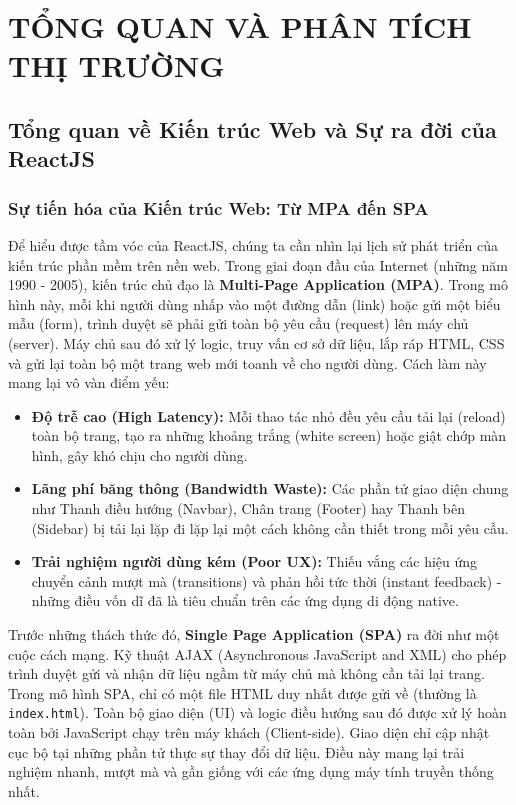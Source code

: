 \part{TỔNG QUAN VÀ PHÂN TÍCH THỊ TRƯỜNG}

\chapter{Tổng quan về Kiến trúc Web và Sự ra đời của ReactJS}

\section{Sự tiến hóa của Kiến trúc Web: Từ MPA đến SPA}
Để hiểu được tầm vóc của ReactJS, chúng ta cần nhìn lại lịch sử phát triển của kiến trúc phần mềm trên nền web. Trong giai đoạn đầu của Internet (những năm 1990 - 2005), kiến trúc chủ đạo là \textbf{Multi-Page Application (MPA)}. Trong mô hình này, mỗi khi người dùng nhấp vào một đường dẫn (link) hoặc gửi một biểu mẫu (form), trình duyệt sẽ phải gửi toàn bộ yêu cầu (request) lên máy chủ (server). Máy chủ sau đó xử lý logic, truy vấn cơ sở dữ liệu, lắp ráp HTML, CSS và gửi lại toàn bộ một trang web mới toanh về cho người dùng. Cách làm này mang lại vô vàn điểm yếu:
\begin{itemize}
    \item \textbf{Độ trễ cao (High Latency):} Mỗi thao tác nhỏ đều yêu cầu tải lại (reload) toàn bộ trang, tạo ra những khoảng trắng (white screen) hoặc giật chớp màn hình, gây khó chịu cho người dùng.
    \item \textbf{Lãng phí băng thông (Bandwidth Waste):} Các phần tử giao diện chung như Thanh điều hướng (Navbar), Chân trang (Footer) hay Thanh bên (Sidebar) bị tải lại lặp đi lặp lại một cách không cần thiết trong mỗi yêu cầu.
    \item \textbf{Trải nghiệm người dùng kém (Poor UX):} Thiếu vắng các hiệu ứng chuyển cảnh mượt mà (transitions) và phản hồi tức thời (instant feedback) - những điều vốn dĩ đã là tiêu chuẩn trên các ứng dụng di động native.
\end{itemize}

Trước những thách thức đó, \textbf{Single Page Application (SPA)} ra đời như một cuộc cách mạng. Kỹ thuật AJAX (Asynchronous JavaScript and XML) cho phép trình duyệt gửi và nhận dữ liệu ngầm từ máy chủ mà không cần tải lại trang. Trong mô hình SPA, chỉ có một file HTML duy nhất được gửi về (thường là \texttt{index.html}). Toàn bộ giao diện (UI) và logic điều hướng sau đó được xử lý hoàn toàn bởi JavaScript chạy trên máy khách (Client-side). Giao diện chỉ cập nhật cục bộ tại những phần tử thực sự thay đổi dữ liệu. Điều này mang lại trải nghiệm nhanh, mượt mà và gần giống với các ứng dụng máy tính truyền thống nhất.

